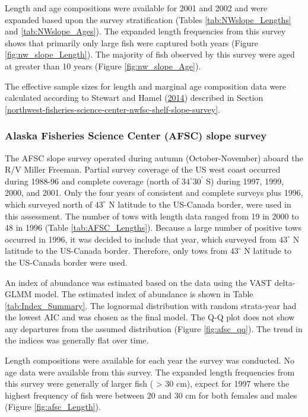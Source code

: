 \documentclass[12pt,]{article}
\begin{document}
Length and age compositions were available for 2001 and 2002 and were
expanded based upon the survey stratification (Tables
\ref{tab:NWslope_Lengths} and \ref{tab:NWslope_Ages}). The expanded
length frequencies from this survey shows that primarily only large fish
were captured both years (Figure \ref{fig:nw_slope_Length}). The
majority of fish observed by this survey were aged at greater than 10
years (Figure \ref{fig:nw_slope_Age}).

The effective sample sizes for length and marginal age composition data
were calculated according to Stewart and Hamel
(\protect\hyperlink{ref-stewart_bootstrapping_2014}{2014}) described in
Section
\ref{northwest-fisheries-science-center-nwfsc-shelf-slope-survey}.

\subsubsection{Alaska Fisheries Science Center (AFSC) slope
survey}\label{alaska-fisheries-science-center-afsc-slope-survey}

The AFSC slope survey operated during autumn (October-November) aboard
the R/V Miller Freeman. Partial survey coverage of the US west coast
occurred during 1988-96 and complete coverage (north of
\(34^\circ 30^\prime\) S) during 1997, 1999, 2000, and 2001. Only the
four years of consistent and complete surveys plus 1996, which surveyed
north of \(43^\circ\) N latitude to the US-Canada border, were used in
this assessment. The number of tows with length data ranged from 19 in
2000 to 48 in 1996 (Table \ref{tab:AFSC_Lengths}). Because a large
number of positive tows occurred in 1996, it was decided to include that
year, which surveyed from \(43^\circ\) N latitude to the US-Canada
border. Therefore, only tows from \(43^\circ\) N latitude to the
US-Canada border were used.

An index of abundance was estimated based on the data using the VAST
delta-GLMM model. The estimated index of abundance is shown in Table
\ref{tab:Index_Summary}. The lognormal distribution with random
strata-year had the lowest AIC and was chosen as the final model. The
Q-Q plot does not show any departures from the assumed distribution
(Figure \ref{fig:afsc_qq}). The trend in the indices was generally flat
over time.

Length compositions were available for each year the survey was
conducted. No age data were available from this survey. The expanded
length frequencies from this survey were generally of larger fish (
\textgreater{} 30 cm), expect for 1997 where the highest frequency of
fish were between 20 and 30 cm for both females and males (Figure
\ref{fig:afsc_Length}).
\end{document}
